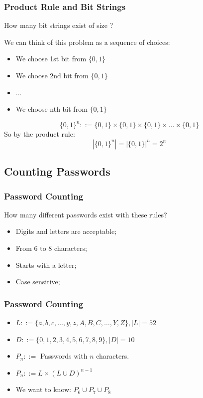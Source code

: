 \documentclass{beamer}
\begin{document}
\begin{frame}
  \frametitle{Product Rule and Bit Strings}

  {\larger

    How many bit strings exist of size ?

    \bigskip

    We can think of this problem as a \alert{sequence of choices}:
    \begin{itemize}
    \item We choose 1st bit from $\{0,1\}$
    \item We choose 2nd bit from $\{0,1\}$
    \item $\ldots$
    \item We choose nth bit from $\{0,1\}$
    \end{itemize}
    
    \begin{equation}
      \{0,1\}^n ::=
      \{0,1\}\times\{0,1\}\times\{0,1\}\times\ldots\times\{0,1\}
    \end{equation}
    So by the product rule:
    \begin{equation}
      |\{0,1\}^n| = |\{0,1\}|^n = 2^n
    \end{equation}
  }
\end{frame}

\subsection{Counting Passwords}

\begin{frame}
  \frametitle{Password Counting}
  
  {\larger

    How many different passwords exist with these rules?

    \bigskip

    \begin{itemize}
    \item Digits and letters are acceptable;
    \item From 6 to 8 characters;
    \item Starts with a letter;
    \item Case sensitive;
    \end{itemize}
  }
\end{frame}

\begin{frame}
  \frametitle{Password Counting}

  {\larger 
    \begin{itemize}
    \item $L ::= \{a,b,c,\ldots,y,z,A,B,C,\ldots,Y,Z\}, |L| = 52$
    \item $D ::= \{0,1,2,3,4,5,6,7,8,9\}, |D| = 10$
    \item $P_n ::=$ Passwords with $n$ characters.
    \item $P_n ::= L \times (L\cup D)^{n-1}$

      \bigskip

    \item We want to know: $P_6 \cup P_7 \cup P_8$
    \end{itemize}
  }
\end{frame}
\end{document}
